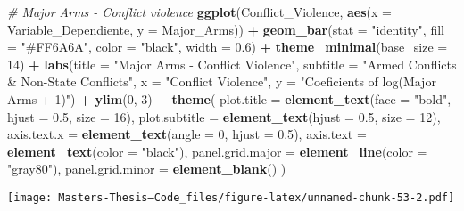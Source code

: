 \documentclass[
  11pt,
]{article}
\newenvironment{Shaded}{\begin{snugshade}}{\end{snugshade}}
\newcommand{\AttributeTok}[1]{\textcolor[rgb]{0.13,0.29,0.53}{#1}}
\newcommand{\CommentTok}[1]{\textcolor[rgb]{0.56,0.35,0.01}{\textit{#1}}}
\newcommand{\DecValTok}[1]{\textcolor[rgb]{0.00,0.00,0.81}{#1}}
\newcommand{\FloatTok}[1]{\textcolor[rgb]{0.00,0.00,0.81}{#1}}
\newcommand{\FunctionTok}[1]{\textcolor[rgb]{0.13,0.29,0.53}{\textbf{#1}}}
\newcommand{\NormalTok}[1]{#1}
\newcommand{\SpecialCharTok}[1]{\textcolor[rgb]{0.81,0.36,0.00}{\textbf{#1}}}
\newcommand{\StringTok}[1]{\textcolor[rgb]{0.31,0.60,0.02}{#1}}
\begin{document}
\begin{Shaded}
\begin{Highlighting}[]
\CommentTok{\# Major Arms {-} Conflict violence}
\FunctionTok{ggplot}\NormalTok{(Conflict\_Violence, }\FunctionTok{aes}\NormalTok{(}\AttributeTok{x =}\NormalTok{ Variable\_Dependiente, }\AttributeTok{y =}\NormalTok{ Major\_Arms)) }\SpecialCharTok{+}
  \FunctionTok{geom\_bar}\NormalTok{(}\AttributeTok{stat =} \StringTok{"identity"}\NormalTok{, }\AttributeTok{fill =} \StringTok{"\#FF6A6A"}\NormalTok{, }\AttributeTok{color =} \StringTok{"black"}\NormalTok{, }\AttributeTok{width =} \FloatTok{0.6}\NormalTok{) }\SpecialCharTok{+}
  \FunctionTok{theme\_minimal}\NormalTok{(}\AttributeTok{base\_size =} \DecValTok{14}\NormalTok{) }\SpecialCharTok{+}
  \FunctionTok{labs}\NormalTok{(}\AttributeTok{title =} \StringTok{"Major Arms {-} Conflict Violence"}\NormalTok{,}
       \AttributeTok{subtitle =} \StringTok{"Armed Conflicts \& Non{-}State Conflicts"}\NormalTok{,}
       \AttributeTok{x =} \StringTok{"Conflict Violence"}\NormalTok{,}
       \AttributeTok{y =} \StringTok{"Coeficients of log(Major Arms + 1)"}\NormalTok{) }\SpecialCharTok{+}
  \FunctionTok{ylim}\NormalTok{(}\DecValTok{0}\NormalTok{, }\DecValTok{3}\NormalTok{) }\SpecialCharTok{+}
  \FunctionTok{theme}\NormalTok{(}
    \AttributeTok{plot.title =} \FunctionTok{element\_text}\NormalTok{(}\AttributeTok{face =} \StringTok{"bold"}\NormalTok{, }\AttributeTok{hjust =} \FloatTok{0.5}\NormalTok{, }\AttributeTok{size =} \DecValTok{16}\NormalTok{),}
    \AttributeTok{plot.subtitle =} \FunctionTok{element\_text}\NormalTok{(}\AttributeTok{hjust =} \FloatTok{0.5}\NormalTok{, }\AttributeTok{size =} \DecValTok{12}\NormalTok{),}
    \AttributeTok{axis.text.x =} \FunctionTok{element\_text}\NormalTok{(}\AttributeTok{angle =} \DecValTok{0}\NormalTok{, }\AttributeTok{hjust =} \FloatTok{0.5}\NormalTok{),}
    \AttributeTok{axis.text =} \FunctionTok{element\_text}\NormalTok{(}\AttributeTok{color =} \StringTok{"black"}\NormalTok{),}
    \AttributeTok{panel.grid.major =} \FunctionTok{element\_line}\NormalTok{(}\AttributeTok{color =} \StringTok{"gray80"}\NormalTok{),}
    \AttributeTok{panel.grid.minor =} \FunctionTok{element\_blank}\NormalTok{()}
\NormalTok{  )}
\end{Highlighting}
\end{Shaded}

\texttt{[image: Masters-Thesis--Code\_files/figure-latex/unnamed-chunk-53-2.pdf]}
\end{document}
